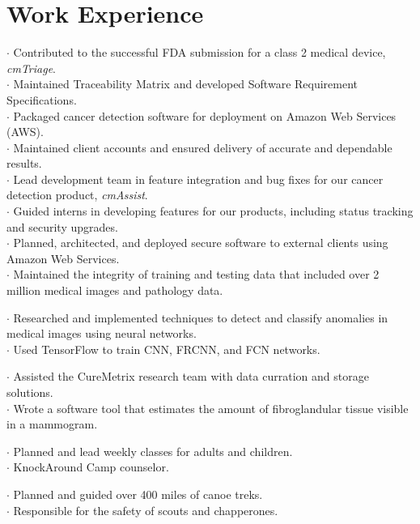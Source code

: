 \section{Work Experience}

$\cdot$ Contributed to the successful FDA submission for a class 2 medical device, {\it cmTriage}.\\
$\cdot$ Maintained Traceability Matrix and developed Software Requirement Specifications.\\
$\cdot$ Packaged cancer detection software for deployment on Amazon Web Services (AWS).\\
$\cdot$ Maintained client accounts and ensured delivery of accurate and dependable results.\\
$\cdot$ Lead development team in feature integration and bug fixes for our cancer detection product, {\it cmAssist}.\\
$\cdot$ Guided interns in developing features for our products, including status tracking and security upgrades.\\
$\cdot$ Planned, architected, and deployed secure software to external clients using Amazon Web Services.\\
$\cdot$ Maintained the integrity of training and testing data that included over 2 million medical images and pathology data.

$\cdot$ Researched and implemented techniques to detect and classify anomalies in medical images using neural networks.\\
$\cdot$ Used TensorFlow to train CNN, FRCNN, and FCN networks.

$\cdot$ Assisted the CureMetrix research team with data curration and storage solutions.\\
$\cdot$ Wrote a software tool that estimates the amount of fibroglandular tissue visible in a mammogram.

$\cdot$ Planned and lead weekly classes for adults and children.\\
$\cdot$ KnockAround Camp counselor.

$\cdot$ Planned and guided over 400 miles of canoe treks.\\
$\cdot$ Responsible for the safety of scouts and chapperones.
